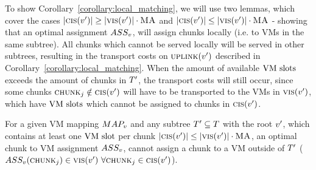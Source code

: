 To show Corollary~\ref{corollary:local_matching}, we will use two lemmas, which 
cover the cases $|\textsc{cis}(v')| \geq 
|\textsc{vis}(v')| \cdot \textsc{MA}$ and 
$|\textsc{cis}(v')| \leq 
|\textsc{vis}(v')| \cdot \textsc{MA}$ - showing that an optimal 
assignment 
$ASS_v$, will assign chunks locally (i.e. to VMs in the 
same subtree). All chunks which cannot be served locally will be served in 
other subtrees, resulting in the transport costs on $\textsc{uplink}(v')$ 
described in Corollary~\ref{corollary:local_matching}. When the amount of 
available $\text{VM slot}\text{s}$ 
exceeds the amount of chunks in $T'$, the transport costs will still occur, 
since some chunks $\textsc{chunk}_j \notin \textsc{cis}(v')$ will have to 
be transported to the VMs in $\textsc{vis}(v')$, which have $\text{VM slot}\text{s}$ 
which cannot be 
assigned to chunks in $\textsc{cis}(v')$.

\begin{lemma}
\label{lemma:matching1}
For a given VM mapping $MAP_v$ and any subtree $T' \subseteq 
T$ with the root $v'$, which contains at least one $\text{VM slot}$ 
per 
chunk $|\textsc{cis}(v')| \leq |\textsc{vis}(v')| \cdot 
\textsc{MA}$, an 
optimal chunk to VM assignment $ASS_v$, cannot assign a chunk 
to a VM outside of $T'$ ($ASS_v(\textsc{chunk}_j) \in 
\textsc{vis}(v')~ \forall \textsc{chunk}_j \in \textsc{cis}(v')$).
\end{lemma}

